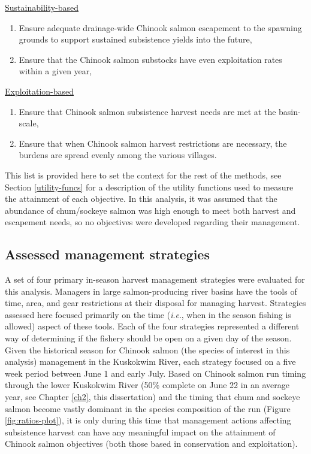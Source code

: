 \documentclass[12pt,]{book}
\theoremstyle{definition}
\theoremstyle{definition}
\theoremstyle{definition}
\theoremstyle{remark}
\begin{document}
\noindent
\underline{Sustainability-based}

\begin{enumerate}
\def\labelenumi{(\arabic{enumi})}
\item
  Ensure adequate drainage-wide Chinook salmon escapement to the
  spawning grounds to support sustained subsistence yields into the
  future,
\item
  Ensure that the Chinook salmon substocks have even exploitation rates
  within a given year,
\end{enumerate}

\noindent
\underline{Exploitation-based}

\begin{enumerate}
\def\labelenumi{(\arabic{enumi})}
\setcounter{enumi}{2}
\item
  Ensure that Chinook salmon subsistence harvest needs are met at the
  basin-scale,
\item
  Ensure that when Chinook salmon harvest restrictions are necessary,
  the burdens are spread evenly among the various villages.
\end{enumerate}

\noindent
This list is provided here to set the context for the rest of the
methods, see Section \ref{utility-funcs} for a description of the
utility functions used to measure the attainment of each objective. In
this analysis, it was assumed that the abundance of chum/sockeye salmon
was high enough to meet both harvest and escapement needs, so no
objectives were developed regarding their management.

\subsection{Assessed management strategies}\label{strategies}

\noindent
A set of four primary in-season harvest management strategies were
evaluated for this analysis. Managers in large salmon-producing river
basins have the tools of time, area, and gear restrictions at their
disposal for managing harvest. Strategies assessed here focused
primarily on the time (\emph{i}.\emph{e}., when in the season fishing is
allowed) aspect of these tools. Each of the four strategies represented
a different way of determining if the fishery should be open on a given
day of the season. Given the historical season for Chinook salmon (the
species of interest in this analysis) management in the Kuskokwim River,
each strategy focused on a five week period between June 1 and early
July. Based on Chinook salmon run timing through the lower Kuskokwim
River (50\% complete on June 22 in an average year, see Chapter
\ref{ch2}, this dissertation) and the timing that chum and sockeye
salmon become vastly dominant in the species composition of the run
(Figure \ref{fig:ratios-plot}), it is only during this time that
management actions affecting subsistence harvest can have any meaningful
impact on the attainment of Chinook salmon objectives (both those based
in conservation and exploitation).
\end{document}
